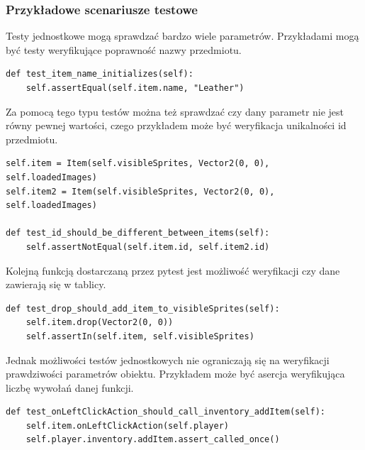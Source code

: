 \documentclass{article}
\begin{document}
\subsubsection{Przykładowe scenariusze testowe}
Testy jednostkowe mogą sprawdzać bardzo wiele parametrów. Przykładami mogą być testy weryfikujące poprawność nazwy przedmiotu.

\begin{center}
    \begin{lstlisting}[language=pythonSchema]
def test_item_name_initializes(self):
    self.assertEqual(self.item.name, "Leather")
    \end{lstlisting}
\end{center}

Za pomocą tego typu testów można też sprawdzać czy dany parametr nie jest równy pewnej wartości, czego przykładem może być weryfikacja unikalności id przedmiotu.

\begin{center}
    \begin{lstlisting}[language=pythonSchema]
self.item = Item(self.visibleSprites, Vector2(0, 0), self.loadedImages)
self.item2 = Item(self.visibleSprites, Vector2(0, 0), self.loadedImages)

def test_id_should_be_different_between_items(self):
    self.assertNotEqual(self.item.id, self.item2.id)
    \end{lstlisting}
\end{center}

Kolejną funkcją dostarczaną przez pytest jest możliwość weryfikacji czy dane zawierają się w tablicy.

\begin{center}
    \begin{lstlisting}[language=pythonSchema]
def test_drop_should_add_item_to_visibleSprites(self):
    self.item.drop(Vector2(0, 0))
    self.assertIn(self.item, self.visibleSprites)
    \end{lstlisting}
\end{center}

Jednak możliwości testów jednostkowych nie ograniczają się na weryfikacji prawdziwości parametrów obiektu. Przykładem może być asercja weryfikująca liczbę wywołań danej funkcji.

\begin{center}
    \begin{lstlisting}[language=pythonSchema]
def test_onLeftClickAction_should_call_inventory_addItem(self):
    self.item.onLeftClickAction(self.player)
    self.player.inventory.addItem.assert_called_once()
    \end{lstlisting}
\end{center}
\end{document}
